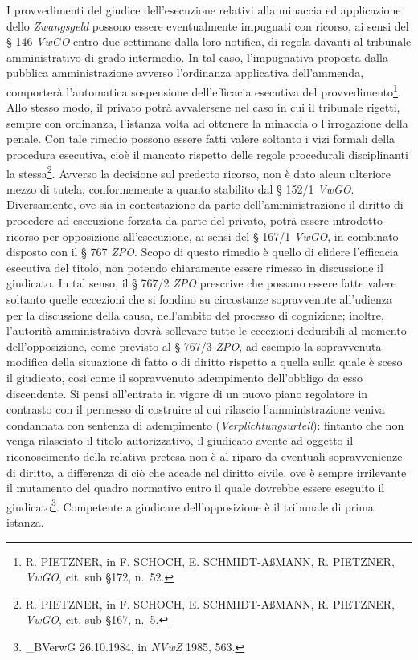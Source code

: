 \documentclass[12pt,it,a4paper,]{report}
\begin{document}
I provvedimenti del giudice dell'esecuzione relativi alla minaccia ed
applicazione dello \emph{Zwangsgeld} possono essere eventualmente
impugnati con ricorso, ai sensi del § 146 \emph{VwGO} entro due
settimane dalla loro notifica, di regola davanti al tribunale
amministrativo di grado intermedio. In tal caso, l'impugnativa proposta
dalla pubblica amministrazione avverso l'ordinanza applicativa
dell'ammenda, comporterà l'automatica sospensione dell'efficacia
esecutiva del provvedimento\footnote{R. PIETZNER, in F. SCHOCH, E.
  SCHMIDT-AßMANN, R. PIETZNER, \emph{VwGO}, cit. sub §172, n.~52.}. Allo
stesso modo, il privato potrà avvalersene nel caso in cui il tribunale
rigetti, sempre con ordinanza, l'istanza volta ad ottenere la minaccia o
l'irrogazione della penale. Con tale rimedio possono essere fatti valere
soltanto i vizi formali della procedura esecutiva, cioè il mancato
rispetto delle regole procedurali disciplinanti la stessa\footnote{R.
  PIETZNER, in F. SCHOCH, E. SCHMIDT-AßMANN, R. PIETZNER, \emph{VwGO},
  cit. sub §167, n.~5.}. Avverso la decisione sul predetto ricorso, non
è dato alcun ulteriore mezzo di tutela, conformemente a quanto stabilito
dal § 152/1 \emph{VwGO}. Diversamente, ove sia in contestazione da parte
dell'amministrazione il diritto di procedere ad esecuzione forzata da
parte del privato, potrà essere introdotto ricorso per opposizione
all'esecuzione, ai sensi del § 167/1 \emph{VwGO}, in combinato disposto
con il § 767 \emph{ZPO}. Scopo di questo rimedio è quello di elidere
l'efficacia esecutiva del titolo, non potendo chiaramente essere rimesso
in discussione il giudicato. In tal senso, il § 767/2 \emph{ZPO}
prescrive che possano essere fatte valere soltanto quelle eccezioni che
si fondino su circostanze sopravvenute all'udienza per la discussione
della causa, nell'ambito del processo di cognizione; inoltre, l'autorità
amministrativa dovrà sollevare tutte le eccezioni deducibili al momento
dell'opposizione, come previsto al § 767/3 \emph{ZPO}, ad esempio la
sopravvenuta modifica della situazione di fatto o di diritto rispetto a
quella sulla quale è sceso il giudicato, così come il sopravvenuto
adempimento dell'obbligo da esso discendente. Si pensi all'entrata in
vigore di un nuovo piano regolatore in contrasto con il permesso di
costruire al cui rilascio l'amministrazione veniva condannata con
sentenza di adempimento (\emph{Verplichtungsurteil}): fintanto che non
venga rilasciato il titolo autorizzativo, il giudicato avente ad oggetto
il riconoscimento della relativa pretesa non è al riparo da eventuali
sopravvenienze di diritto, a differenza di ciò che accade nel diritto
civile, ove è sempre irrilevante il mutamento del quadro normativo entro
il quale dovrebbe essere eseguito il giudicato\footnote{\_BVerwG
  26.10.1984, in \emph{NVwZ} 1985, 563.}. Competente a giudicare
dell'opposizione è il tribunale di prima istanza.
\end{document}
